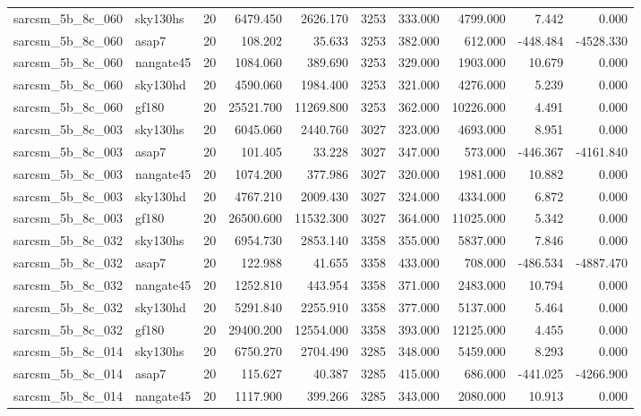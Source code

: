 \begin{tabular}{llrrrrrrrr}
sarcsm\_5b\_8c\_060 & sky130hs & 20 & 6479.450 & 2626.170 & 3253 & 333.000 & 4799.000 & 7.442 & 0.000 \\
sarcsm\_5b\_8c\_060 & asap7 & 20 & 108.202 & 35.633 & 3253 & 382.000 & 612.000 & -448.484 & -4528.330 \\
sarcsm\_5b\_8c\_060 & nangate45 & 20 & 1084.060 & 389.690 & 3253 & 329.000 & 1903.000 & 10.679 & 0.000 \\
sarcsm\_5b\_8c\_060 & sky130hd & 20 & 4590.060 & 1984.400 & 3253 & 321.000 & 4276.000 & 5.239 & 0.000 \\
sarcsm\_5b\_8c\_060 & gf180 & 20 & 25521.700 & 11269.800 & 3253 & 362.000 & 10226.000 & 4.491 & 0.000 \\
sarcsm\_5b\_8c\_003 & sky130hs & 20 & 6045.060 & 2440.760 & 3027 & 323.000 & 4693.000 & 8.951 & 0.000 \\
sarcsm\_5b\_8c\_003 & asap7 & 20 & 101.405 & 33.228 & 3027 & 347.000 & 573.000 & -446.367 & -4161.840 \\
sarcsm\_5b\_8c\_003 & nangate45 & 20 & 1074.200 & 377.986 & 3027 & 320.000 & 1981.000 & 10.882 & 0.000 \\
sarcsm\_5b\_8c\_003 & sky130hd & 20 & 4767.210 & 2009.430 & 3027 & 324.000 & 4334.000 & 6.872 & 0.000 \\
sarcsm\_5b\_8c\_003 & gf180 & 20 & 26500.600 & 11532.300 & 3027 & 364.000 & 11025.000 & 5.342 & 0.000 \\
sarcsm\_5b\_8c\_032 & sky130hs & 20 & 6954.730 & 2853.140 & 3358 & 355.000 & 5837.000 & 7.846 & 0.000 \\
sarcsm\_5b\_8c\_032 & asap7 & 20 & 122.988 & 41.655 & 3358 & 433.000 & 708.000 & -486.534 & -4887.470 \\
sarcsm\_5b\_8c\_032 & nangate45 & 20 & 1252.810 & 443.954 & 3358 & 371.000 & 2483.000 & 10.794 & 0.000 \\
sarcsm\_5b\_8c\_032 & sky130hd & 20 & 5291.840 & 2255.910 & 3358 & 377.000 & 5137.000 & 5.464 & 0.000 \\
sarcsm\_5b\_8c\_032 & gf180 & 20 & 29400.200 & 12554.000 & 3358 & 393.000 & 12125.000 & 4.455 & 0.000 \\
sarcsm\_5b\_8c\_014 & sky130hs & 20 & 6750.270 & 2704.490 & 3285 & 348.000 & 5459.000 & 8.293 & 0.000 \\
sarcsm\_5b\_8c\_014 & asap7 & 20 & 115.627 & 40.387 & 3285 & 415.000 & 686.000 & -441.025 & -4266.900 \\
sarcsm\_5b\_8c\_014 & nangate45 & 20 & 1117.900 & 399.266 & 3285 & 343.000 & 2080.000 & 10.913 & 0.000 \\

\end{tabular}
